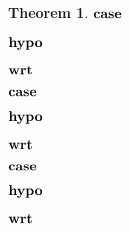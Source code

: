 \documentclass[acmsmall]{acmart}
\theoremstyle{definition}
\newtheorem{theorem}{Theorem}[section]
\begin{document}
\begin{theorem}
    \item \Z $\textbf{case } $
    \item \Z $\textbf{hypo } $
    \item \Z $\textbf{wrt } $
      \item \Z\Z {} 

    \item \Z $\textbf{case } $
    \item \Z $\textbf{hypo } $
    \item \Z $\textbf{wrt } $
      \item \Z\Z {} 

    \item \Z $\textbf{case } $
    \item \Z $\textbf{hypo } $
    \item \Z $\textbf{wrt } $
      \item \Z\Z {} 


\end{theorem}
\end{document}
